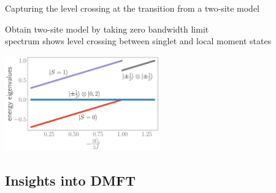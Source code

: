 \documentclass[8pt,aspectratio=169]{beamer}
\begin{document}
\begin{frame}{Capturing the level crossing at the transition from a two-site model}

\begin{itemize}
	\nitem Obtain two-site model by taking \alert{zero bandwidth} limit\\[10pt]
	\nitem spectrum shows \alert{level crossing} between singlet and local moment states
\end{itemize}

\vspace*{\fill}

\includegraphics[width=0.5\textwidth]{twosite_spectrum.pdf}
\end{frame}

\begin{frame}{}
\section{Insights into DMFT}
\end{frame}
\end{document}
